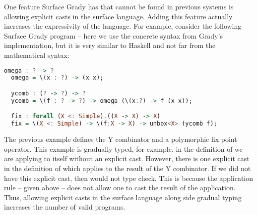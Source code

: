 One feature Surface Grady has that cannot be found in previous systems
is allowing explicit casts in the surface language.  Adding this
feature actually increases the expressivity of the language.  For
example, consider the following Surface Grady program -- here we use
the concrete syntax from Grady's implementation, but it is very
similar to Haskell and not far from the mathematical syntax:
\begin{lstlisting}[language=Haskell]
  omega : ? -> ?
  omega = \(x : ?) -> (x x);

  ycomb : (? -> ?) -> ?
  ycomb = \(f : ? -> ?) -> omega (\(x:?) -> f (x x));

  fix : forall (X <: Simple).((X -> X) -> X)
  fix = \(X <: Simple) -> \(f:X -> X) -> unbox<X> (ycomb f);
\end{lstlisting}
The previous example defines the Y combinator and a polymorphic fix
point operator.  This example is gradually typed, for example, in the
definition of  we are applying  to
itself without an explicit cast.  However, there is one explicit cast
in the definition of  which applies
 to the result of the Y combinator.  If we did not
have this explicit cast, then  would not type check.
This is because the application rule -- given above -- does not allow
one to cast the result of the application.  Thus, allowing explicit
casts in the surface language along side gradual typing increases the
number of valid programs.


